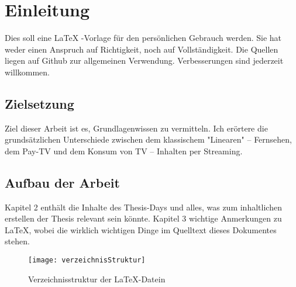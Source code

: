 \section{Einleitung}

Dies soll eine \LaTeX{} -Vorlage für den persönlichen Gebrauch werden. Sie hat weder einen Anspruch auf Richtigkeit, noch auf Vollständigkeit. Die Quellen liegen auf Github zur allgemeinen Verwendung. Verbesserungen sind jederzeit willkommen.

\subsection{Zielsetzung}
Ziel dieser Arbeit ist es, Grundlagenwissen zu vermitteln. Ich erörtere die grundsätzlichen Unterschiede zwischen dem klassischem "Linearen" -- Fernsehen, dem Pay-TV und dem Konsum von TV -- Inhalten per Streaming.

\subsection{Aufbau der Arbeit}
Kapitel 2 enthält die Inhalte des Thesis-Days und alles, was zum inhaltlichen erstellen der Thesis relevant sein könnte. Kapitel 3 wichtige Anmerkungen zu \LaTeX{}, wobei die wirklich wichtigen Dinge im Quelltext dieses Dokumentes stehen.

\begin{figure}[H]
\begin{center}
\texttt{[image: verzeichnisStruktur]}
\caption{Verzeichnisstruktur der \LaTeX{}-Datein}
\end{center}
\end{figure}
